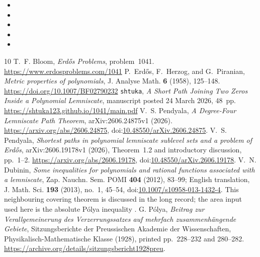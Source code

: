 \documentclass[11pt]{article}
\begin{document}
\begin{itemize}[leftmargin=*]
\item {}
\item {}
\item {}
\item {}
\item {}
\end{itemize}

\begin{thebibliography}{10}
 T.~F. Bloom, \emph{Erd\H{o}s Problems}, problem~1041.
  \url{https://www.erdosproblems.com/1041}
 P.~Erd\H{o}s, F.~Herzog, and G.~Piranian,
  \emph{Metric properties of polynomials}, J. Analyse Math. \textbf{6}
  (1958), 125--148. \url{https://doi.org/10.1007/BF02790232}
 \texttt{shtuka},
  \emph{A Short Path Joining Two Zeros Inside a Polynomial Lemniscate},
  manuscript posted 24 March 2026, 48~pp.
  \url{https://shtuka123.github.io/1041/main.pdf}
 V.~S. Pendyala,
  \emph{A Degree-Four Lemniscate Path Theorem},
  arXiv:2606.24875v1 (2026).
  \url{https://arxiv.org/abs/2606.24875},
  doi:\href{https://doi.org/10.48550/arXiv.2606.24875}
  {10.48550/arXiv.2606.24875}.
 V.~S. Pendyala,
  \emph{Shortest paths in polynomial lemniscate sublevel sets and a problem
  of Erd\H{o}s}, arXiv:2606.19178v1 (2026),
  Theorem~1.2 and introductory discussion, pp.~1--2.
  \url{https://arxiv.org/abs/2606.19178},
  doi:\href{https://doi.org/10.48550/arXiv.2606.19178}
  {10.48550/arXiv.2606.19178}.
 V.~N. Dubinin, \emph{Some inequalities for polynomials and
  rational functions associated with a lemniscate}, Zap. Nauchn. Sem. POMI
  \textbf{404} (2012), 83--99; English translation, J. Math. Sci. \textbf{193}
  (2013), no.~1, 45--54,
  doi:\href{https://doi.org/10.1007/s10958-013-1432-4}{10.1007/s10958-013-1432-4}.
  This neighbouring covering theorem is discussed in the long record; the area input used here is the absolute P\'olya inequality \cite{polya1928}.
 G. P\'olya,
  \emph{Beitrag zur Verallgemeinerung des Verzerrungssatzes auf mehrfach
  zusammenh\"angende Gebiete}, Sitzungsberichte der Preussischen Akademie der
  Wissenschaften, Physikalisch-Mathematische Klasse (1928), printed
  pp.~228--232 and 280--282.
  \url{https://archive.org/details/sitzungsbericht1928preu}.
\end{thebibliography}
\end{document}
